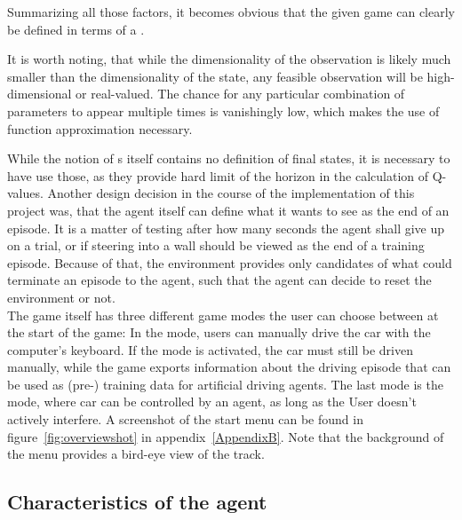 Summarizing all those factors, it becomes obvious that the given game can clearly be defined in terms of a .

It is worth noting, that while the dimensionality of the observation is likely much smaller than the dimensionality of the state, any feasible observation will be high-dimensional or real-valued. The chance for any particular combination of parameters to appear multiple times is vanishingly low, which makes the use of function approximation necessary.

While the notion of s itself contains no definition of final states, it is necessary to have use those, as they provide hard limit of the horizon in the calculation of Q-values. Another design decision in the course of the implementation of this project was, that the agent itself can define what it wants to see as the end of an episode. It is a matter of testing after how many seconds the agent shall give up on a trial, or if steering into a wall should be viewed as the end of a training episode. Because of that, the environment provides only candidates of what could terminate an episode to the agent, such that the agent can decide to reset the environment or not. \\

The game itself has three different game modes the user can choose between at the start of the game: In the  mode, users can manually drive the car with the computer's keyboard. If the  mode is activated, the car must still be driven manually, while the game exports information about the driving episode that can be used as (pre-) training data for artificial driving agents. The last mode is the  mode, where car can be controlled by an agent, as long as the User doesn't actively interfere. A screenshot of the start menu can be found in figure~\ref{fig:overviewshot} in appendix~\ref{AppendixB}. Note that the background of the menu provides a bird-eye view of the track.

\subsection{Characteristics of the agent}
\label{ch:agentchars}

